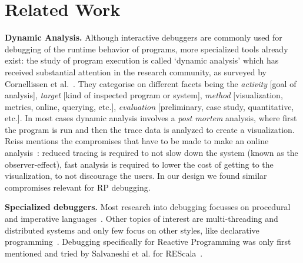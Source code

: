 \section{Related Work}

\textbf{Dynamic Analysis.}
Although interactive debuggers are commonly used for debugging 
of the runtime behavior of programs, more specialized tools already exist: 
the study of program execution is called `dynamic analysis' which has 
received substantial attention in the research community,
as surveyed by Cornellissen et al.~\cite{cornelissen2009systematic}.
They categorise on different facets being the 
\textit{activity} [goal of analysis],
\textit{target} [kind of inspected program or system],
\textit{method} [visualization, metrics, online, querying, etc.],
\textit{evaluation} [preliminary, case study, quantitative, etc.].
In most cases dynamic analysis involves a \textit{post mortem} analysis, 
where first the program is run and then the trace data is analyzed to create a visualization.
Reiss mentions the compromises that have to be made to make an online analysis~\cite{reiss2006visualizing}: 
reduced tracing is required to not slow down the system (known as the observer-effect), 
fast analysis is required to lower the cost of getting to the visualization, to not discourage the users.
In our design we found similar compromises relevant for RP debugging.


\textbf{Specialized debuggers.}
Most research into debugging focusses on procedural and 
imperative languages~\cite{cornelissen2009systematic}.
Other topics of interest are multi-threading and distributed systems and 
only few focus on other styles, like declarative programming~\cite{nilsson1998declarative}.
Debugging specifically for Reactive Programming was only first mentioned and tried by Salvaneshi et al. for REScala~\cite{salvaneschi2014empirical,salvaneschi2016debugging}.


